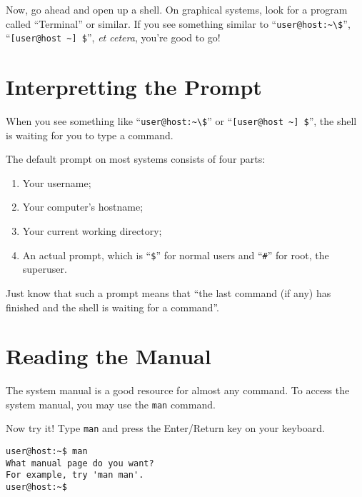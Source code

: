 \documentclass{extbook}
\begin{document}
Now, go ahead and open up a shell.  On graphical systems, look for a program called ``Terminal'' or similar.  If you see something similar to ``\verb|user@host:~\$|'', ``\verb|[user@host ~] $|'', \textit{et cetera}, you're good to go!

\section{Interpretting the Prompt}

When you see something like ``\verb|user@host:~\$|'' or ``\verb|[user@host ~] $|'', the shell is waiting for you to type a command.

The default prompt on most systems consists of four parts:
\begin{enumerate}
	\item Your username;
	\item Your computer's hostname;
	\item Your current working directory;
	\item An actual prompt, which is ``\verb|$|'' for normal users and ``\verb|#|'' for root, the superuser.
\end{enumerate}


Just know that such a prompt means that ``the last command (if any) has finished and the shell is waiting for a command''.

\section{Reading the Manual}

The system manual is a good resource for almost any command.  To access the system manual, you may use the \verb|man| command.

Now try it!  Type \verb|man| and press the Enter/Return key on your keyboard.
\begin{verbatim}
user@host:~$ man
What manual page do you want?
For example, try 'man man'.
user@host:~$ 
\end{verbatim}
\end{document}
